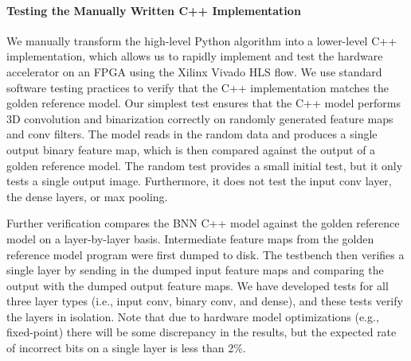 


\paragraph{Testing the Manually Written C++ Implementation}
We manually transform the high-level Python algorithm into a lower-level
C++ implementation, which allows us to rapidly implement and test the hardware accelerator on an FPGA using the Xilinx Vivado HLS flow.  
We use standard software testing practices to verify
that the C++ implementation matches the golden reference model. Our
simplest test ensures that the C++ model performs 3D convolution and
binarization correctly on randomly generated feature maps and conv
filters. The model reads in the random data and produces a single output
binary feature map, which is then compared against the output of a golden
reference model. The random test provides a small initial test, but it
only tests a single output image. Furthermore, it does not test the input
conv layer, the dense layers, or max pooling.

Further verification compares the BNN C++ model against the golden
reference model on a layer-by-layer basis. Intermediate feature maps from
the golden reference model program were first dumped to disk. The
testbench then verifies a single layer by sending in the dumped input
feature maps and comparing the output with the dumped output feature
maps. We have developed tests for all three layer types (i.e., input
conv, binary conv, and dense), and these tests verify the layers in
isolation. Note that due to hardware model optimizations (e.g.,
fixed-point) there will be some discrepancy in the results, but the
expected rate of incorrect bits on a single layer is less than 2\%.

